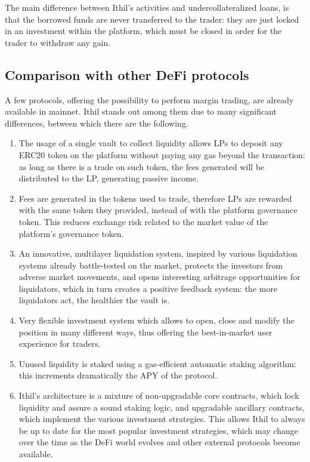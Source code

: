 \documentclass [10pt, fancyhdr, twoside] {article}
\begin{document}
The main difference between Ithil's activities and undercollateralized loans, is that the borrowed funds are never transferred to the trader: they are just locked in an investment within the platform, which must be closed in order for the trader to withdraw any gain.

\subsection{Comparison with other DeFi protocols}
A few protocols, offering the possibility to perform margin trading, are already available in mainnet. Ithil stands out among them due to many significant differences, between which there are the following.
\begin{enumerate}
\item The usage of a single vault to collect liquidity allows LPs to deposit any ERC20 token on the platform without paying any gas beyond the transaction: as long as there is a trade on such token, the fees generated will be distributed to the LP, generating passive income.
\item Fees are generated in the tokens used to trade, therefore LPs are rewarded with the same token they provided, instead of with the platform governance token. This reduces exchange risk related to the market value of the platform's governance token.
\item An innovative, multilayer liquidation system, inspired by various liquidation systems already battle-tested on the market, protects the investors from adverse market movements, and opens interesting arbitrage opportunities for liquidators, which in turn creates a positive feedback system: the more liquidators act, the healthier the vault is.
\item Very flexible investment system which allows to open, close and modify the position in many different ways, thus offering the best-in-market user experience for traders.
\item Unused liquidity is staked using a gas-efficient automatic staking algorithm: this increments dramatically the APY of the protocol.
\item Ithil's architecture is a mixture of non-upgradable core contracts, which lock liquidity and assure a sound staking logic, and upgradable ancillary contracts, which implement the various investment strategies. This allows Ithil to always be up to date for the most popular investment strategies, which may change over the time as the DeFi world evolves and other external protocols become available.
\end{enumerate}
\end{document}
